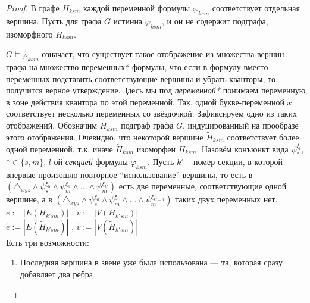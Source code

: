 \begin{proof}
В графе $H_{ksm}$ каждой переменной формулы $\varphi_{ksm}$ соответствует отдельная вершина.
Пусть для графа $G$ истинна $\varphi_{ksm}$, и он не содержит подграфа, изоморфного $H_{ksm}$.

$G \vDash \varphi_{ksm}$
означает, что существует такое отображение из множества вершин графа на множество переменных* формулы, что если в формулу вместо переменных подставить соответствующие вершины и убрать кванторы, то получится верное утверждение.
Здесь мы под \textit{переменной*} понимаем переменную в зоне действия квантора по этой переменной.
Так, одной букве-переменной $x$ соответствует несколько переменных со звёздочкой.
Зафиксируем одно из таких отображений.
Обозначим $\tilde H_{ksm}$ подграф графа $G$, индуцированный на прообразе этого отображения.
Очевидно, что некоторой вершине $\tilde H_{ksm}$ соответствует более одной переменной, т.к.  иначе $\tilde H_{ksm}$ изоморфен $H_{ksm}$.
Назовём конъюнкт вида $\psi^{\xi_l}_*$, $* \in \{s, m \}$, $l$-ой \textit{секцией} формулы $\varphi_{ksm}$.
Пусть $k'$ -- номер секции, в которой впервые произошло повторное ``использование'' вершины, то есть в $(\triangle_{xyz} \wedge \psi_{s}^{\xi_0} \wedge \psi_{m}^{\xi_1} \wedge \ldots \wedge \psi_{m}^{\xi_{k'}})$ есть две переменные, соответствующие одной вершине, а в $(\triangle_{xyz} \wedge \psi_{s}^{\xi_0} \wedge \psi_{m}^{\xi_1} \wedge \ldots \wedge \psi_{m}^{\xi_{k'-1}})$ таких двух переменных нет.
$e:= |E(H_{k'sm})|$ , $v:= |V(H_{k'sm})|$\\
$\tilde e:= |E(\tilde H_{k'sm})|$ , $\tilde v:= |V(\tilde H_{k'sm})|$\\
Есть три возможности:
\begin{enumerate}
\item 
Последняя вершина в звене уже была использована --- та, которая сразу добавляет два ребра

\end{enumerate}
\end{proof}
